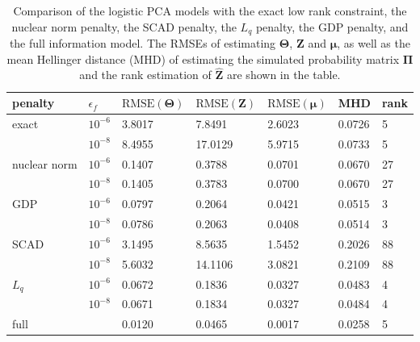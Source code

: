 \begin{table}[htbp]
\centering
\caption{Comparison of the logistic PCA models with the exact low rank constraint, the nuclear norm penalty, the SCAD penalty, the $L_{q}$ penalty, the GDP penalty, and the full information model. The RMSEs of estimating $\mathbf{\Theta}$, $\mathbf{Z}$ and $\bm{\mu}$, as well as the mean Hellinger distance (MHD) of estimating the simulated probability matrix $\mathbf{\Pi}$ and the rank estimation of $\hat{\mathbf{Z}}$ are shown in the table.}
\label{chapter3_tab:2}
\begin{tabular}{lllllll}
  \toprule
penalty & $\epsilon_f$ & $\text{RMSE}(\mathbf{\Theta})$ & $\text{RMSE}(\mathbf{Z})$ & $\text{RMSE}(\bm{\mu})$ & MHD & rank \\
  \midrule
  \multirow{2}{0.5em}{exact} & $10^{-6}$  &3.8017    &7.8491    &2.6023    &0.0726    &5      \\
                             & $10^{-8}$  &8.4955    &17.0129   &5.9715    &0.0733    &5      \\
  \hline
  \multirow{2}{0.5em}{nuclear norm} & $10^{-6}$  &0.1407    &0.3788    &0.0701    &0.0670   &27      \\
                                    & $10^{-8}$  &0.1405    &0.3783    &0.0700    &0.0670   &27     \\
  \hline
  \multirow{2}{0.5em}{GDP} & $10^{-6}$   &0.0797    &0.2064    &0.0421    &0.0515    &3    \\
                           & $10^{-8}$   &0.0786    &0.2063    &0.0408    &0.0514    &3    \\
  \hline
  \multirow{2}{0.5em}{SCAD} & $10^{-6}$  &3.1495    &8.5635    &1.5452    &0.2026   &88      \\
                            & $10^{-8}$  &5.6032    &14.1106    &3.0821    &0.2109   &88    \\
  \hline
  \multirow{2}{0.5em}{$L_{q}$} & $10^{-6}$   &0.0672    &0.1836    &0.0327    &0.0483  &4    \\
                           & $10^{-8}$   &0.0671    &0.1834    &0.0327    &0.0484    &4    \\
  \hline
  full &   &0.0120    &0.0465    &0.0017    &0.0258    &5     \\

  \bottomrule
\end{tabular}
\end{table}

